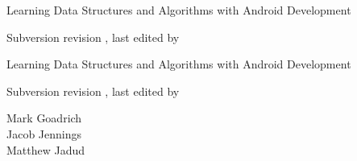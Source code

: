 \documentclass[10pt]{book}
\newcommand{\thetitle}{Learning Data Structures and Algorithms with Android Development}
\newcommand{\svnversioninfo}{Subversion revision \svnrev, last edited by \svnauthor \\
\svndate}
\begin{document}
\frontmatter





\begin{latexonly}

\renewcommand{\blankpage}{\thispagestyle{empty} \quad \newpage}


\thispagestyle{empty}

\begin{flushright}
\vspace*{2.5in}

\begin{spacing}{3}
{\huge \thetitle}
\end{spacing}

\vspace{0.25in}

\svnversioninfo

\vfill

\end{flushright}


\blankpage
\blankpage

\pagebreak
\thispagestyle{empty}

\begin{flushright}
\vspace*{2.5in}

\begin{spacing}{3}
{\huge \thetitle}
\end{spacing}

\vspace{0.25in}

\svnversioninfo

\vspace{1in}


{\Large
Mark Goadrich\\
Jacob Jennings\\
Matthew Jadud\\
}


\vspace{0.5in}

\vfill

\end{flushright}



\end{latexonly}
\end{document}
